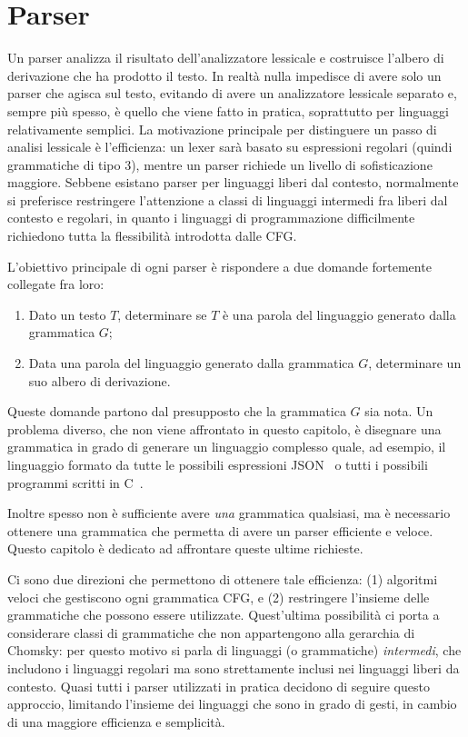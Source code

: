 \chapter{Parser}\label{cha:parser}



Un parser analizza il risultato dell'analizzatore lessicale e costruisce l'albero di derivazione che ha prodotto il testo.
In realtà nulla impedisce di avere solo un parser che agisca sul testo, evitando di avere un analizzatore lessicale
separato e, sempre più spesso, è quello che viene fatto in pratica, soprattutto per linguaggi relativamente semplici.
La motivazione principale per distinguere un passo di analisi lessicale è l'efficienza: un lexer sarà basato su
espressioni regolari (quindi grammatiche di tipo 3), mentre un parser richiede un livello di sofisticazione maggiore.
Sebbene esistano parser per linguaggi liberi dal contesto, normalmente si preferisce restringere l'attenzione a classi
di linguaggi intermedi fra liberi dal contesto e regolari, in quanto i linguaggi di programmazione difficilmente
richiedono tutta la flessibilità introdotta dalle CFG.


L'obiettivo principale di ogni parser è rispondere a due domande fortemente collegate fra loro:
\begin{enumerate}
\item Dato un testo $T$, determinare se $T$ è una parola del linguaggio generato dalla grammatica $G$;
\item Data una parola del linguaggio generato dalla grammatica $G$, determinare un suo albero di derivazione.
\end{enumerate}

Queste domande partono dal presupposto che la grammatica $G$ sia nota.
Un problema diverso, che non viene affrontato in questo capitolo, è disegnare una grammatica in grado di generare un
linguaggio complesso quale, ad esempio, il linguaggio formato da tutte le possibili espressioni JSON~\cite{ECMA:JSON} o tutti i possibili
programmi scritti in C~\cite{gustedt:modern-c}.

Inoltre spesso non è sufficiente avere \emph{una} grammatica qualsiasi, ma è necessario ottenere una grammatica che permetta di
avere un parser efficiente e veloce.
Questo capitolo è dedicato ad affrontare queste ultime richieste.

Ci sono due direzioni che permettono di ottenere tale efficienza: (1) algoritmi veloci che gestiscono ogni grammatica
CFG, e (2) restringere l'insieme delle grammatiche che possono essere utilizzate.
Quest'ultima possibilità ci porta a considerare classi di grammatiche che non appartengono alla gerarchia di Chomsky:
per questo motivo si parla di linguaggi (o grammatiche) \emph{intermedi}, che includono i linguaggi regolari  ma sono
strettamente inclusi nei linguaggi liberi da contesto.
Quasi tutti i parser utilizzati in pratica decidono di seguire questo approccio, limitando l'insieme dei linguaggi che
sono in grado di gesti, in cambio di una maggiore efficienza e semplicità.




